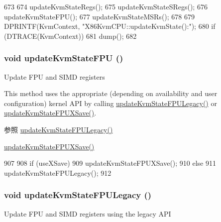 \begin{DoxyCode}
673 {
674     updateKvmStateRegs();
675     updateKvmStateSRegs();
676     updateKvmStateFPU();
677     updateKvmStateMSRs();
678 
679     DPRINTF(KvmContext, "X86KvmCPU::updateKvmState():\n");
680     if (DTRACE(KvmContext))
681         dump();
682 }
\end{DoxyCode}
\hypertarget{classX86KvmCPU_a1c8ff9ec0ad33f11a2212a37e2a79f6c}{
\subsubsection[{updateKvmStateFPU}]{\setlength{\rightskip}{0pt plus 5cm}void updateKvmStateFPU ()}}
\label{classX86KvmCPU_a1c8ff9ec0ad33f11a2212a37e2a79f6c}
Update FPU and SIMD registers

This method uses the appropriate (depending on availability and user configuration) kernel API by calling \hyperlink{classX86KvmCPU_a3eccabf97e73ee194068ee37c2422c50}{updateKvmStateFPULegacy()} or \hyperlink{classX86KvmCPU_aa1d3c8572c67dd0c4457ba46307f35f1}{updateKvmStateFPUXSave()}.

\begin{DoxySeeAlso}{参照}
\hyperlink{classX86KvmCPU_a3eccabf97e73ee194068ee37c2422c50}{updateKvmStateFPULegacy()} 

\hyperlink{classX86KvmCPU_aa1d3c8572c67dd0c4457ba46307f35f1}{updateKvmStateFPUXSave()} 
\end{DoxySeeAlso}



\begin{DoxyCode}
907 {
908     if (useXSave)
909         updateKvmStateFPUXSave();
910     else
911         updateKvmStateFPULegacy();
912 }
\end{DoxyCode}
\hypertarget{classX86KvmCPU_a3eccabf97e73ee194068ee37c2422c50}{
\subsubsection[{updateKvmStateFPULegacy}]{\setlength{\rightskip}{0pt plus 5cm}void updateKvmStateFPULegacy ()}}
\label{classX86KvmCPU_a3eccabf97e73ee194068ee37c2422c50}
Update FPU and SIMD registers using the legacy API

